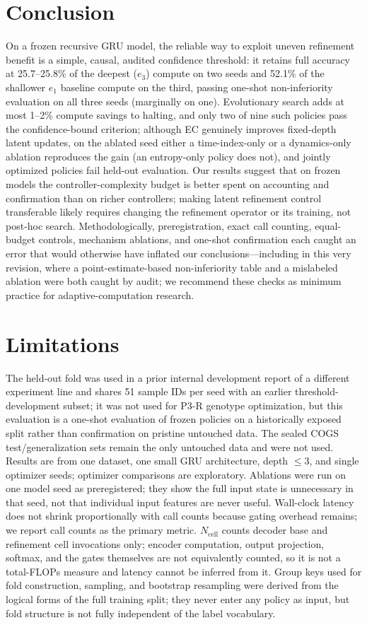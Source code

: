 \documentclass[11pt]{article}
\begin{document}
\section{Conclusion}
\label{sec:conclusion}
On a frozen recursive GRU model, the reliable way to exploit uneven refinement benefit is a simple, causal, audited confidence threshold: it retains full accuracy at 25.7--25.8\% of the deepest ($e_3$) compute on two seeds and 52.1\% of the shallower $e_1$ baseline compute on the third, passing one-shot non-inferiority evaluation on all three seeds (marginally on one). Evolutionary search adds at most 1--2\% compute savings to halting, and only two of nine such policies pass the confidence-bound criterion; although EC genuinely improves fixed-depth latent updates, on the ablated seed either a time-index-only or a dynamics-only ablation reproduces the gain (an entropy-only policy does not), and jointly optimized policies fail held-out evaluation. Our results suggest that on frozen models the controller-complexity budget is better spent on accounting and confirmation than on richer controllers; making latent refinement control transferable likely requires changing the refinement operator or its training, not post-hoc search. Methodologically, preregistration, exact call counting, equal-budget controls, mechanism ablations, and one-shot confirmation each caught an error that would otherwise have inflated our conclusions---including in this very revision, where a point-estimate-based non-inferiority table and a mislabeled ablation were both caught by audit; we recommend these checks as minimum practice for adaptive-computation research.

\section*{Limitations}
The held-out fold was used in a prior internal development report of a different experiment line and shares 51 sample IDs per seed with an earlier threshold-development subset; it was not used for P3-R genotype optimization, but this evaluation is a one-shot evaluation of frozen policies on a historically exposed split rather than confirmation on pristine untouched data. The sealed COGS test/generalization sets remain the only untouched data and were not used. Results are from one dataset, one small GRU architecture, depth $\leq 3$, and single optimizer seeds; optimizer comparisons are exploratory. Ablations were run on one model seed as preregistered; they show the full input state is unnecessary in that seed, not that individual input features are never useful. Wall-clock latency does not shrink proportionally with call counts because gating overhead remains; we report call counts as the primary metric. $N_{\mathrm{cell}}$ counts decoder base and refinement cell invocations only; encoder computation, output projection, softmax, and the gates themselves are not equivalently counted, so it is not a total-FLOPs measure and latency cannot be inferred from it. Group keys used for fold construction, sampling, and bootstrap resampling were derived from the logical forms of the full training split; they never enter any policy as input, but fold structure is not fully independent of the label vocabulary.
\end{document}
